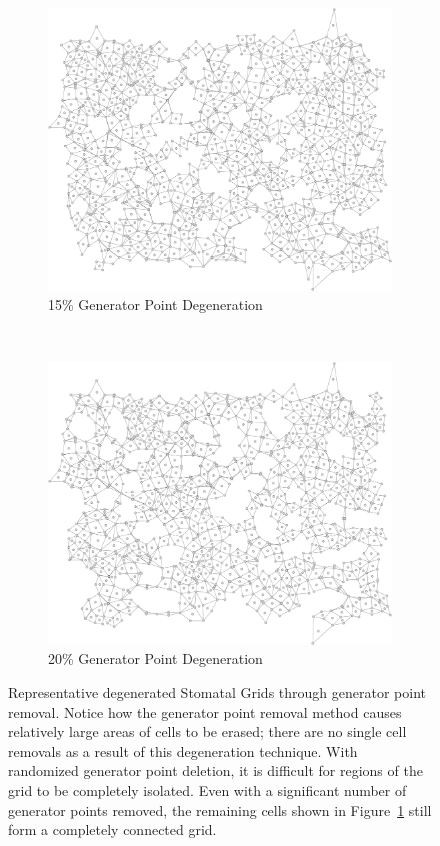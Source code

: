 \documentclass[a4paper,11pt,twoside]{report}
\begin{document}
\begin{figure}[htp]
\begin{subfigure}[t]{0.4\textwidth}
  \centering
  \includegraphics[width=\textwidth]{ch6_figs/degen_stoma_15_grid}
  \caption{15\% Generator Point Degeneration}
  \end{subfigure}
~
\begin{subfigure}[t]{0.4\textwidth}
  \centering
  \includegraphics[width=\textwidth]{ch6_figs/degen_stoma_20_grid}
  \caption{20\% Generator Point Degeneration}
  \label{fig:stoma_gen_pt_20}
  \end{subfigure}

\caption[Stomatal Generator Point Degeneration]{
  Representative degenerated Stomatal Grids through generator point removal. Notice how the generator point removal method causes relatively large areas of cells to be erased; there are no single cell removals as a result of this degeneration technique. With randomized generator point deletion, it is difficult for regions of the grid to be completely isolated. Even with a significant number of generator points removed, the remaining cells shown in Figure~\ref{fig:stoma_gen_pt_20} still form a completely connected grid.
}
\label{fig:stoma_gen_pt_degen}
\end{figure}
\end{document}
